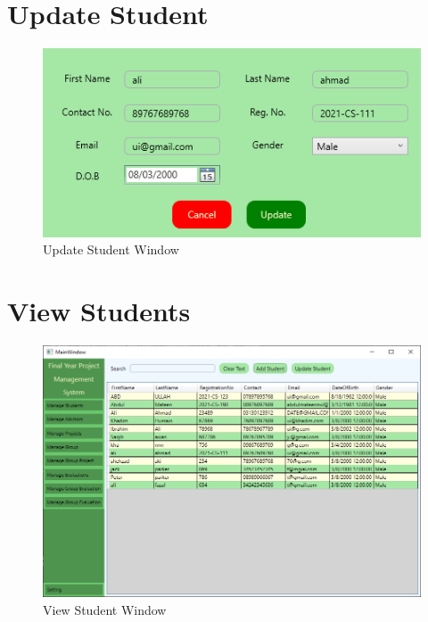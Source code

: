 \documentclass[a4paper, 12pt, oneside]{uet_thesis}
\begin{document}
\section{Update Student}
\begin{figure}[h]
    \centering
    \includegraphics[width=1\textwidth]{Figures/UpdateStudent.png}
    \caption{Update Student Window}
    \label{fig:my_label}
\end{figure}

\clearpage

\section{View Students}
\begin{figure}[h]
    \centering
    \includegraphics[width=1\textwidth]{Figures/ViewStudents.png}
    \caption{View Student Window}
    \label{fig:my_label}
\end{figure}
\end{document}
